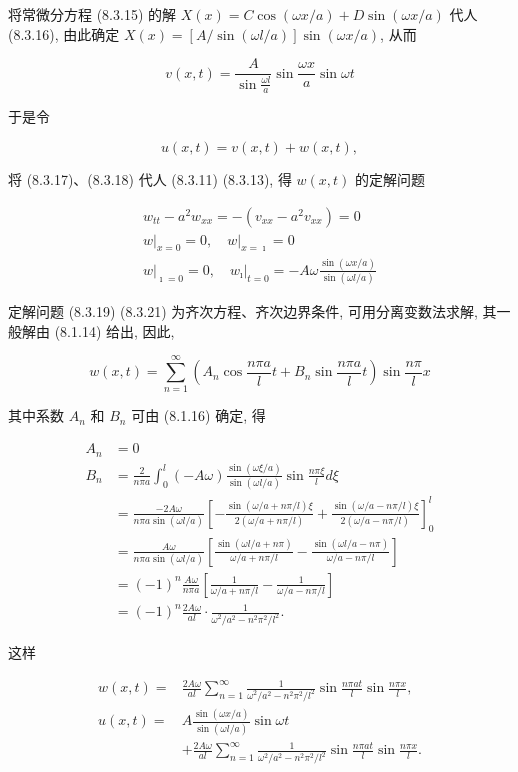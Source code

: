 将常微分方程 (8.3.15) 的解 $X(x)=C \cos (\omega x / a)+D \sin (\omega x / a)$ 代人 (8.3.16), 由此确定 $X(x)=[A / \sin (\omega l / a)] \sin (\omega x / a)$, 从而

$$
v(x, t)=\frac{A}{\sin \frac{\omega l}{a}} \sin \frac{\omega x}{a} \sin \omega t
$$

于是令

$$
u(x, t)=v(x, t)+w(x, t),
$$

将 (8.3.17)、(8.3.18) 代人 (8.3.11) (8.3.13), 得 $w(x, t)$ 的定解问题

$$
\begin{gathered}
w_{t t}-a^{2} w_{x x}=-\left(v_{x x}-a^{2} v_{x x}\right)=0 \\
\left.w\right|_{x=0}=0,\left.\quad w\right|_{x=\imath}=0 \\
\left.w\right|_{\imath=0}=0,\left.\quad w_{\imath}\right|_{t=0}=-A \omega \frac{\sin (\omega x / a)}{\sin (\omega l / a)}
\end{gathered}
$$

定解问题 (8.3.19) (8.3.21) 为齐次方程、齐次边界条件, 可用分离变数法求解, 其一般解由 (8.1.14) 给出, 因此,

$$
w(x, t)=\sum_{n=1}^{\infty}\left(A_{n} \cos \frac{n \pi a}{l} t+B_{n} \sin \frac{n \pi a}{l} t\right) \sin \frac{n \pi}{l} x
$$

其中系数 $A_{n}$ 和 $B_{n}$ 可由 (8.1.16) 确定, 得

$$
\begin{aligned}
A_{n} & =0 \\
B_{n} & =\frac{2}{n \pi a} \int_{0}^{l}(-A \omega) \frac{\sin (\omega \xi / a)}{\sin (\omega l / a)} \sin \frac{n \pi \xi}{l} d \xi \\
& =\frac{-2 A \omega}{n \pi a \sin (\omega l / a)}\left[-\frac{\sin (\omega / a+n \pi / l) \xi}{2(\omega / a+n \pi / l)}+\frac{\sin (\omega / a-n \pi / l) \xi}{2(\omega / a-n \pi / l)}\right]_{0}^{l} \\
& =\frac{A \omega}{n \pi a \sin (\omega l / a)}\left[\frac{\sin (\omega l / a+n \pi)}{\omega / a+n \pi / l}-\frac{\sin (\omega l / a-n \pi)}{\omega / a-n \pi / l}\right] \\
& =(-1)^{n} \frac{A \omega}{n \pi a}\left[\frac{1}{\omega / a+n \pi / l}-\frac{1}{\omega / a-n \pi / l}\right] \\
& =(-1)^{n} \frac{2 A \omega}{a l} \cdot \frac{1}{\omega^{2} / a^{2}-n^{2} \pi^{2} / l^{2}} .
\end{aligned}
$$

这样

$$
\begin{aligned}
w(x, t)= & \frac{2 A \omega}{a l} \sum_{n=1}^{\infty} \frac{1}{\omega^{2} / a^{2}-n^{2} \pi^{2} / l^{2}} \sin \frac{n \pi a t}{l} \sin \frac{n \pi x}{l}, \\
u(x, t)= & A \frac{\sin (\omega x / a)}{\sin (\omega l / a)} \sin \omega t \\
& +\frac{2 A \omega}{a l} \sum_{n=1}^{\infty} \frac{1}{\omega^{2} / a^{2}-n^{2} \pi^{2} / l^{2}} \sin \frac{n \pi a t}{l} \sin \frac{n \pi x}{l} .
\end{aligned}
$$